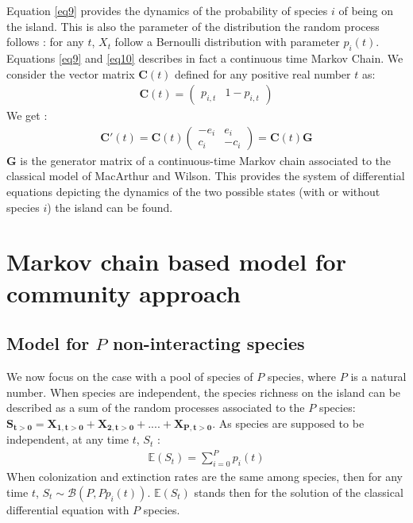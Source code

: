 Equation \eqref{eq9} provides the dynamics of the probability of species $i$ of being on the island. This is also the parameter of the distribution the random process follows : for any $t$, $X_t$ follow a Bernoulli distribution with parameter $p_i(t)$. Equations \eqref{eq9} and \eqref{eq10} describes in fact a continuous time Markov Chain. We consider the vector matrix $\mathbf{C}(t)$ defined for any positive real number $t$ as:
\begin{eqnarray}
\label{eq11} \mathbf{C}(t)=\left(\begin{array}{cc}p_{i,t} & 1-p_{i,t} \end{array}\right)
\end{eqnarray}
We get :
\begin{eqnarray}
\label{eq12} \mathbf{C}'(t)=\mathbf{C}(t)\left(\begin{array}{cc}-e_i & e_i \\c_i & -c_i\end{array}\right)= \mathbf{C}(t)\mathbf{G}
\end{eqnarray}
$\mathbf{G}$ is the generator matrix of a continuous-time Markov chain associated to the classical model of MacArthur and Wilson. This provides the system of differential equations depicting the dynamics of the two possible states (with or without species $i$) the island can be found.



\section{Markov chain based model for community approach}

\subsection{Model for $P$ non-interacting species}

We now focus on the case with a pool of species of $P$ species, where $P$ is a natural number. When species are independent, the species richness on the island can be described as a sum of the random processes associated to the $P$ species: $\mathbf{S_{t>0}}=\mathbf{X_{1,t>0}} + \mathbf{X_{2,t>0}} + .... + \mathbf{X_{P,t>0}}$. As species are supposed to be independent, at any time $t$, $S_t$ :
\begin{eqnarray}
\label{eq2.1} \mathbb{E}(S_t)=\sum_{i=0}^Pp_i(t)
\end{eqnarray}
When colonization and extinction rates are the same among species, then for any time $t$, $S_t\sim \mathcal{B}(P,Pp_i(t))$. $\mathbb{E}(S_t)$ stands then for the solution of the classical differential equation with $P$ species.

